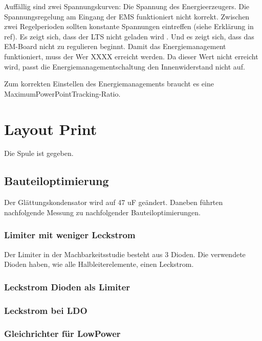 Auffällig sind zwei Spannungskurven: Die Spannung des Energieerzeugers. Die Spannungsregelung am Eingang der EMS funktioniert nicht korrekt. Zwischen zwei Regelperioden sollten konstante Spannungen eintreffen (siehe Erklärung in ref). 
Es zeigt sich, dass der LTS nicht geladen wird . Und es zeigt sich, dass das EM-Board nicht zu regulieren beginnt. Damit das Energiemanagement funktioniert, muss der Wer XXXX erreicht werden. Da dieser Wert nicht erreicht wird, passt die Energiemanagementschaltung den Innenwiderstand nicht auf.

Zum korrekten Einstellen des Energiemanagements braucht es eine MaximumPowerPointTracking-Ratio.








\section{Layout Print}

Die Spule ist gegeben.

\subsection{Bauteiloptimierung}
Der Glättungskondensator wird auf 47 uF geändert. Daneben führten nachfolgende Messung zu nachfolgender Bauteiloptimierungen.

\subsubsection{Limiter mit weniger Leckstrom}
Der Limiter in der Machbarkeitsstudie besteht aus 3 Dioden. Die verwendete Dioden haben, wie alle Halbleiterelemente, einen Leckstrom. 

\subsubsection*{Leckstrom Dioden als Limiter}


\subsubsection*{Leckstrom bei LDO}



\subsubsection{Gleichrichter für LowPower}


